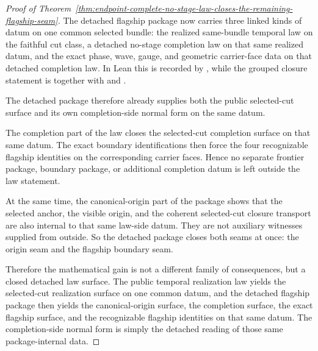 \begin{proof}[Proof of Theorem~\ref{thm:endpoint-complete-no-stage-law-closes-the-remaining-flagship-seam}]
\label{proof:thm:endpoint-complete-no-stage-law-closes-the-remaining-flagship-seam}
The detached flagship package now carries three linked kinds of datum on one
common selected bundle: the realized same-bundle temporal law on the faithful
cut class, a detached no-stage completion law on that same realized datum, and
the exact phase, wave, gauge, and geometric carrier-face data on that detached
completion law. In Lean this is recorded by
,
while the grouped closure statement is
 together
with 
and .

The detached package therefore already supplies both the public selected-cut
surface and its own completion-side normal form on the same datum.

The completion part of the law closes the selected-cut completion surface on
that same datum. The exact boundary identifications then force the four
recognizable flagship identities on the corresponding carrier faces. Hence no
separate frontier package, boundary package, or additional completion datum is
left outside the law statement.

At the same time, the canonical-origin part of the package shows that the selected
anchor, the visible origin, and the coherent selected-cut closure transport are
also internal to that same law-side datum. They are not auxiliary witnesses
supplied from outside. So the detached package closes both seams at once: the origin seam and the
flagship boundary seam.

Therefore the mathematical gain is not a different family of consequences, but
a closed detached law surface. The public temporal realization law yields the
selected-cut realization surface on one common datum, and the detached
flagship package then yields the canonical-origin surface, the completion
surface, the exact flagship surface, and the recognizable flagship identities
on that same datum. The completion-side normal form is simply the detached
reading of those same package-internal data.
\end{proof}

